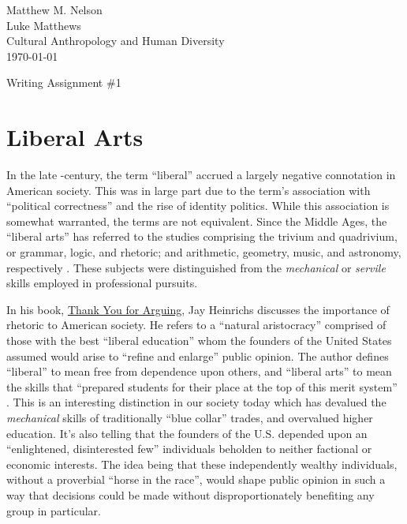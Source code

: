 \documentclass[12pt]{article}
\begin{document}
\begin{flushright}
\singlespacing
Matthew M. Nelson\\
Luke Matthews\\
Cultural Anthropology and Human Diversity\\
\today\\
\end{flushright}
\doublespacing

\begin{center}
  Writing Assignment \#1
\end{center}

\section*{Liberal Arts}

In the late -century, the term ``liberal'' accrued a largely negative
connotation in American society. This was in large part due to the term's
association with ``political correctness'' and the rise of identity politics.
While this association is somewhat warranted, the terms are not equivalent.
Since the Middle Ages, the ``liberal arts'' has referred to the studies
comprising the trivium and quadrivium, or grammar, logic, and rhetoric; and
arithmetic, geometry, music, and astronomy, respectively
\autocite[3]{Joseph.2002}. These subjects were distinguished from the
\emph{mechanical} or \emph{servile} skills employed in professional pursuits.

In his book, \uline{Thank You for Arguing}, Jay Heinrichs discusses the
importance of rhetoric to American society. He refers to a ``natural
aristocracy'' comprised of those with the best ``liberal education'' whom the
founders of the United States assumed would arise to ``refine and enlarge''
public opinion. The author defines ``liberal'' to mean free from dependence upon
others, and ``liberal arts'' to mean the skills that ``prepared students for
their place at the top of this merit system''
\autocite[366]{heinrichs2017thank}. This is an interesting distinction in our
society today which has devalued the \emph{mechanical} skills of traditionally
``blue collar'' trades, and overvalued higher education. It's also telling that
the founders of the U.S. depended upon an ``enlightened, disinterested few''
\autocite[367]{heinrichs2017thank} individuals beholden to neither factional or
economic interests. The idea being that these independently wealthy individuals,
without a proverbial ``horse in the race'', would shape public opinion in such a
way that decisions could be made without disproportionately benefiting any group
in particular.
\end{document}
